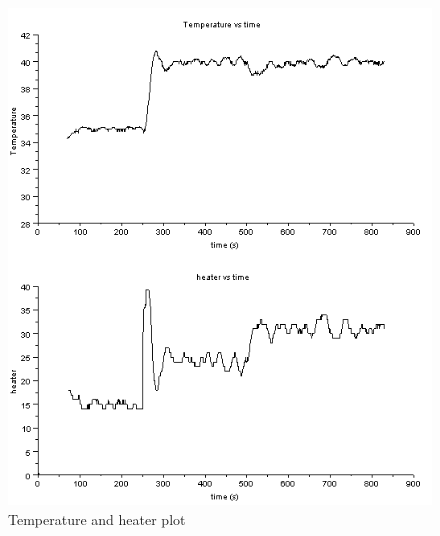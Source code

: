 \begin{figure}[H]
\centering
  \includegraphics{mpc/5_4_heater_final.png}
  \caption{Temperature and heater plot}
\end{figure}


